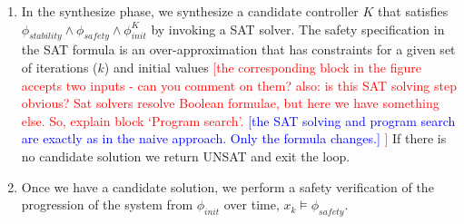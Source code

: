 \documentclass[twocolumn]{autart}    %
\newcommand{\mat}[1]{{#1}}
\renewcommand{\note}[1]{\textcolor{red}{[#1]}}
\newcommand{\reply}[1]{\textcolor{blue}{[#1]}}
\begin{document}
\begin{enumerate}
\begin{enumerate}
\end{enumerate}
\item In the {\sc synthesize} phase, we synthesize a candidate controller
  $K$ 
  that satisfies
  $\phi_\mathit{stability} \wedge \phi_\mathit{safety} \wedge \phi_\mathit{init}^{K}$ by invoking a SAT solver.  
  The safety specification in the SAT formula is an over-approximation that has constraints for a given set of iterations ($k$) and initial values
  \note{the corresponding block in the figure accepts two inputs - can you comment on them? also: is this SAT solving step obvious? Sat solvers resolve Boolean formulae, but here we have something else. So, explain block `Program search'. \reply{the SAT solving and program search are exactly as in the naive approach. Only the formula changes.} }
If there is no candidate solution we return UNSAT and exit the loop. 
\item Once we have a candidate solution, we perform a safety verification %
  of the 
  progression of the system from $\phi_\mathit{init}$ over time,
$x_{k} \models \phi_\mathit{safety}$. %

\end{enumerate}
\end{document}
